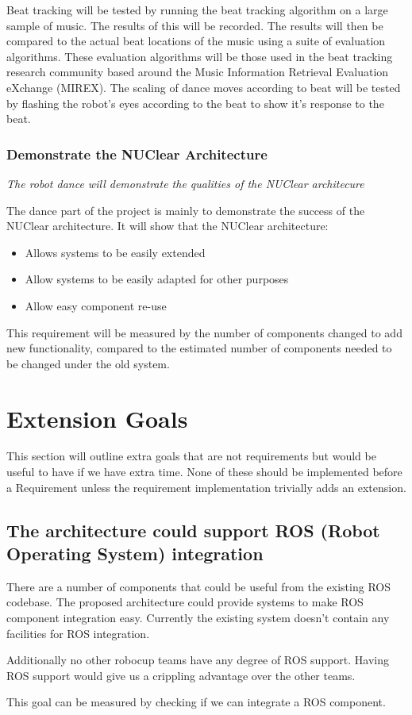 \documentclass[english,12pt]{scrartcl}
\newcommand{\requirement}[1]{\textit{#1}}
\begin{document}
				Beat tracking will be tested by running the beat tracking algorithm on a large sample of music. The results of this will be recorded. The results will then be compared to the actual beat locations of the music using a suite of evaluation algorithms. These evaluation algorithms will be those used in the beat tracking research community based around the Music Information Retrieval Evaluation eXchange (MIREX).
				The scaling of dance moves according to beat will be tested by flashing the robot's eyes according to the beat to show it's response to the beat.
			\subsubsection{Demonstrate the NUClear Architecture}
				\requirement{The robot dance will demonstrate the qualities of the NUClear architecure}

				The dance part of the project is mainly to demonstrate the success of the NUClear architecture. It will show that the NUClear architecture:
				\begin{itemize}
					\item{Allows systems to be easily extended}
					\item{Allow systems to be easily adapted for other purposes}
					\item{Allow easy component re-use}
				\end{itemize}
				
				This requirement will be measured by the number of components changed to add new functionality, compared to the estimated number of components needed to be changed under the old system.

	\section{Extension Goals}
		This section will outline extra goals that are not requirements but would be useful to have
		if we have extra time. None of these should be implemented before a Requirement unless the
		requirement implementation trivially adds an extension.

		\subsection{The architecture could support ROS (Robot Operating System) integration}
			There are a number of components that could be useful from the existing ROS codebase.
			The proposed architecture could provide systems to make ROS component integration easy.
			Currently the existing system doesn't contain any facilities for ROS integration.

			Additionally no other \gls{robocup} teams have any degree of ROS support. Having ROS support
			would give us a crippling advantage over the other teams.

			This goal can be measured by checking if we can integrate a ROS component.

	
	
	
	\printglossaries
\end{document}
